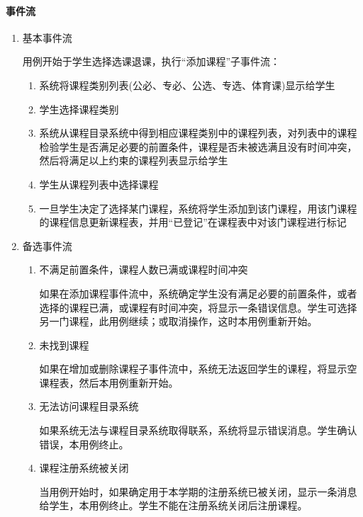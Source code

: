 \paragraph{事件流}
  \begin{enumerate}
    \item 基本事件流
    
    用例开始于学生选择选课退课，执行“添加课程”子事件流：
    \begin{enumerate}[(1)]
      \item 系统将课程类别列表(公必、专必、公选、专选、体育课)显示给学生
      \item 学生选择课程类别
      \item 系统从课程目录系统中得到相应课程类别中的课程列表，对列表中的课程检验学生是否满足必要的前置条件，课程是否未被选满且没有时间冲突，然后将满足以上约束的课程列表显示给学生
      \item 学生从课程列表中选择课程
      \item 一旦学生决定了选择某门课程，系统将学生添加到该门课程，用该门课程的课程信息更新课程表，并用“已登记”在课程表中对该门课程进行标记
    \end{enumerate}

    \item 备选事件流
    \begin{enumerate}[(1)]
      \item 不满足前置条件，课程人数已满或课程时间冲突
      
      \CJKindent 如果在添加课程事件流中，系统确定学生没有满足必要的前置条件，或者选择的课程已满，或课程有时间冲突，将显示一条错误信息。学生可选择另一门课程，此用例继续；或取消操作，这时本用例重新开始。
      
      \item 未找到课程
      
      \CJKindent 如果在增加或删除课程子事件流中，系统无法返回学生的课程，将显示空课程表，然后本用例重新开始。
      
      \item 无法访问课程目录系统
      
      \CJKindent 如果系统无法与课程目录系统取得联系，系统将显示错误消息。学生确认错误，本用例终止。
      
      \item 课程注册系统被关闭
      
      \CJKindent 当用例开始时，如果确定用于本学期的注册系统已被关闭，显示一条消息给学生，本用例终止。学生不能在注册系统关闭后注册课程。
    \end{enumerate}
  \end{enumerate}
  
